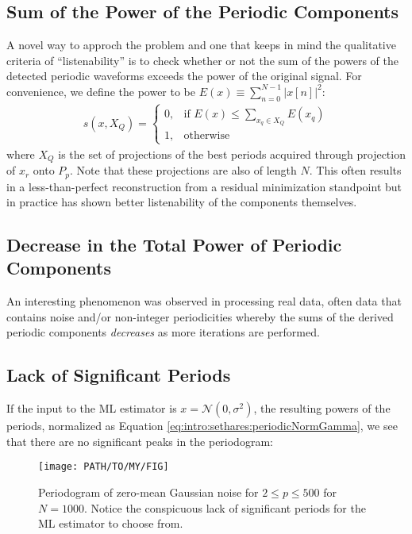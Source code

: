     \subsection{Sum of the Power of the Periodic Components}
    A novel way to approch the problem and one that keeps in mind the qualitative criteria of ``listenability'' is to check whether or not the sum of the powers of the detected periodic waveforms exceeds the power of the original signal. For convenience, we define the power to be $E(x) \equiv \sum_{n = 0}^{N - 1} |x[n]|^2$:
    \begin{align}
        s(x, X_Q) = \begin{cases}
            0, & \text{if } E(x) \leq \sum_{x_q \in X_Q} E(x_q) \\
            1, & \text{otherwise}
        \end{cases}
    \end{align}
    where $X_Q$ is the set of projections of the best periods acquired through projection of $x_r$ onto $P_p$. Note that these projections are also of length $N$. This often results in a less-than-perfect reconstruction from a residual minimization standpoint but in practice has shown better listenability of the components themselves.

    \subsection{Decrease in the Total Power of Periodic Components}
    An interesting phenomenon was observed in processing real data, often data that contains noise and/or non-integer periodicities whereby the sums of the derived periodic components \emph{decreases} as more iterations are performed.

    \subsection{Lack of Significant Periods}
    If the input to the ML estimator is $x = \mathcal{N}(0, \sigma^2)$, the resulting powers of the periods, normalized as Equation \eqref{eq:intro:sethares:periodicNormGamma}, we see that there are no significant peaks in the periodogram:
    \begin{figure}[h]
        \centering
        \texttt{[image: PATH/TO/MY/FIG]}
        \caption[Periodogram of zero-mean Gaussian noise for $2 \leq p \leq 500$ for $N = 1000$]
        {Periodogram of zero-mean Gaussian noise for $2 \leq p \leq 500$ for $N = 1000$. Notice the conspicuous lack of significant periods for the ML estimator to choose from.}
        \label{fig:detection:gaussianPeriodogram}
    \end{figure}

